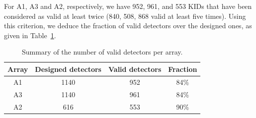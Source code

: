 For A1, A3 and A2, respectively, we have 952, 961, and 553 KIDs that
have been considered as valid at least twice (840, 508, 868 valid at
least five times). Using this criterion, we deduce the fraction of
valid detectors over the designed ones, as given in Table~\ref{tab:number_of_kids}.



\begin{table}[ht]
\begin{center}  
  \begin{tabular}{|c|c|c|c|}
    \hline
    Array & Designed detectors &  Valid detectors & Fraction\\
    \hline\hline
    A1 & 1140 & 952 &  84\%\\
    A3 & 1140 & 961 &  84\%\\
    A2 & 616  & 553 &  90\%\\
    \hline
  \end{tabular}
  \caption[Number of detectors]{Summary of the number of valid detectors per array.}
  \label{tab:number_of_kids}
\end{center}    
\end{table}


